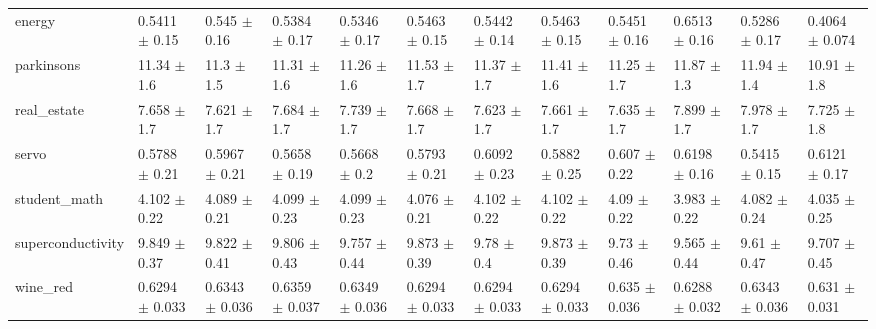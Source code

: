 \begin{tabular}{llllllllllll}
energy & 0.5411 $\pm$ 0.15 & 0.545 $\pm$ 0.16 & 0.5384 $\pm$ 0.17 & 0.5346 $\pm$ 0.17 & 0.5463 $\pm$ 0.15 & 0.5442 $\pm$ 0.14 & 0.5463 $\pm$ 0.15 & 0.5451 $\pm$ 0.16 & 0.6513 $\pm$ 0.16 & 0.5286 $\pm$ 0.17 & 0.4064 $\pm$ 0.074 \\
parkinsons & 11.34 $\pm$ 1.6 & 11.3 $\pm$ 1.5 & 11.31 $\pm$ 1.6 & 11.26 $\pm$ 1.6 & 11.53 $\pm$ 1.7 & 11.37 $\pm$ 1.7 & 11.41 $\pm$ 1.6 & 11.25 $\pm$ 1.7 & 11.87 $\pm$ 1.3 & 11.94 $\pm$ 1.4 & 10.91 $\pm$ 1.8 \\
real\_estate & 7.658 $\pm$ 1.7 & 7.621 $\pm$ 1.7 & 7.684 $\pm$ 1.7 & 7.739 $\pm$ 1.7 & 7.668 $\pm$ 1.7 & 7.623 $\pm$ 1.7 & 7.661 $\pm$ 1.7 & 7.635 $\pm$ 1.7 & 7.899 $\pm$ 1.7 & 7.978 $\pm$ 1.7 & 7.725 $\pm$ 1.8 \\
servo & 0.5788 $\pm$ 0.21 & 0.5967 $\pm$ 0.21 & 0.5658 $\pm$ 0.19 & 0.5668 $\pm$ 0.2 & 0.5793 $\pm$ 0.21 & 0.6092 $\pm$ 0.23 & 0.5882 $\pm$ 0.25 & 0.607 $\pm$ 0.22 & 0.6198 $\pm$ 0.16 & 0.5415 $\pm$ 0.15 & 0.6121 $\pm$ 0.17 \\
student\_math & 4.102 $\pm$ 0.22 & 4.089 $\pm$ 0.21 & 4.099 $\pm$ 0.23 & 4.099 $\pm$ 0.23 & 4.076 $\pm$ 0.21 & 4.102 $\pm$ 0.22 & 4.102 $\pm$ 0.22 & 4.09 $\pm$ 0.22 & 3.983 $\pm$ 0.22 & 4.082 $\pm$ 0.24 & 4.035 $\pm$ 0.25 \\
superconductivity & 9.849 $\pm$ 0.37 & 9.822 $\pm$ 0.41 & 9.806 $\pm$ 0.43 & 9.757 $\pm$ 0.44 & 9.873 $\pm$ 0.39 & 9.78 $\pm$ 0.4 & 9.873 $\pm$ 0.39 & 9.73 $\pm$ 0.46 & 9.565 $\pm$ 0.44 & 9.61 $\pm$ 0.47 & 9.707 $\pm$ 0.45 \\
wine\_red & 0.6294 $\pm$ 0.033 & 0.6343 $\pm$ 0.036 & 0.6359 $\pm$ 0.037 & 0.6349 $\pm$ 0.036 & 0.6294 $\pm$ 0.033 & 0.6294 $\pm$ 0.033 & 0.6294 $\pm$ 0.033 & 0.635 $\pm$ 0.036 & 0.6288 $\pm$ 0.032 & 0.6343 $\pm$ 0.036 & 0.631 $\pm$ 0.031 \\
\bottomrule
\end{tabular}

